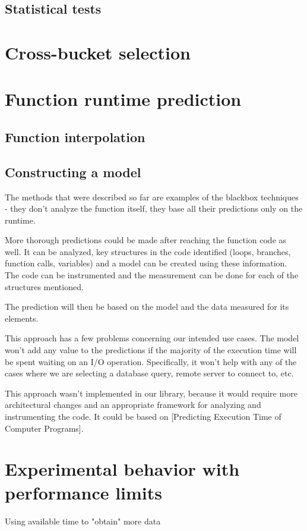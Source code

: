 \subsection{Statistical tests}

\section{Cross-bucket selection}

\section{Function runtime prediction}

\subsection{Function interpolation}

\subsection{Constructing a model}

The methods that were described so far are examples of the blackbox techniques - they don't analyze the function itself, they base all their predictions only on the runtime.

More thorough predictions could be made after reaching the function code as well. It can be analyzed, key structures in the code identified (loops, branches, function calls, variables) and a model can be created using these information. The code can be instrumented and the measurement can be done for each of the structures mentioned. 

The prediction will then be based on the model and the data measured for its elements.

This approach has a few problems concerning our intended use cases. The model won't add any value to the predictions if the majority of the execution time will be spent waiting on an I/O operation. Specifically, it won't help with any of the cases where we are selecting a database query, remote server to connect to, etc.

This approach wasn't implemented in our library, because it would require more architectural changes and an appropriate framework for analyzing and instrumenting the code. It could be based on [Predicting Execution Time of Computer Programs].

\section{Experimental behavior with performance limits}
Using available time to "obtain" more data

